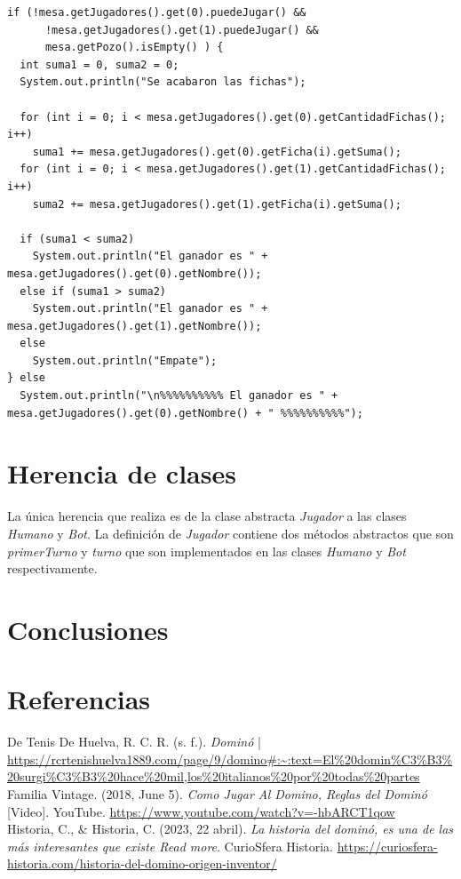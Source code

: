 \documentclass[12pt]{article}
\begin{document}
  \begin{lstlisting}
if (!mesa.getJugadores().get(0).puedeJugar() && 
      !mesa.getJugadores().get(1).puedeJugar() &&
      mesa.getPozo().isEmpty() ) {
  int suma1 = 0, suma2 = 0;
  System.out.println("Se acabaron las fichas");

  for (int i = 0; i < mesa.getJugadores().get(0).getCantidadFichas(); i++)
    suma1 += mesa.getJugadores().get(0).getFicha(i).getSuma();
  for (int i = 0; i < mesa.getJugadores().get(1).getCantidadFichas(); i++)
    suma2 += mesa.getJugadores().get(1).getFicha(i).getSuma();
  
  if (suma1 < suma2)
    System.out.println("El ganador es " + mesa.getJugadores().get(0).getNombre());
  else if (suma1 > suma2)
    System.out.println("El ganador es " + mesa.getJugadores().get(1).getNombre());
  else
    System.out.println("Empate");
} else 
  System.out.println("\n%%%%%%%%%% El ganador es " + mesa.getJugadores().get(0).getNombre() + " %%%%%%%%%%");
  \end{lstlisting}

  \section{Herencia de clases}
  La única herencia que realiza es de la clase abstracta \textit{Jugador} a las clases \textit{Humano} y \textit{Bot}. La definición de \textit{Jugador} contiene dos métodos abstractos que son \textit{primerTurno} y \textit{turno} que son implementados en las clases \textit{Humano} y \textit{Bot} respectivamente.

  \section{Conclusiones}


  \section{Referencias}
  De Tenis De Huelva, R. C. R. (s. f.). \textit{Dominó} | \url{https://rcrtenishuelva1889.com/page/9/domino#:~:text=El%20domin%C3%B3%20surgi%C3%B3%20hace%20mil,los%20italianos%20por%20todas%20partes} \\

  Familia Vintage. (2018, June 5). \textit{Como Jugar Al Domino, Reglas del Dominó} [Video]. YouTube. \url{https://www.youtube.com/watch?v=-hbARCT1qow} \\

  Historia, C., $\&$ Historia, C. (2023, 22 abril). \textit{La historia del dominó, es una de las más interesantes que existe Read more}. CurioSfera Historia. \url{https://curiosfera-historia.com/historia-del-domino-origen-inventor/} \\
\end{document}
